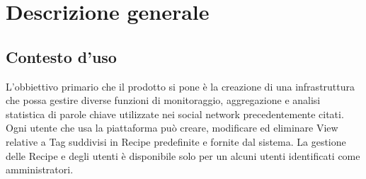 %


\section{Descrizione generale}

\subsection{Contesto d'uso}
L'obbiettivo primario che il prodotto si pone è la creazione di una infrastruttura che
possa gestire diverse funzioni di monitoraggio, aggregazione e analisi statistica di parole chiave utilizzate nei social network precedentemente citati. Ogni utente che usa la piattaforma può creare, modificare ed eliminare View\gloss{} relative a Tag suddivisi in Recipe\gloss{} predefinite e fornite dal sistema.
La gestione delle Recipe\gloss{} e degli utenti è disponibile solo per un alcuni utenti identificati come amministratori.

